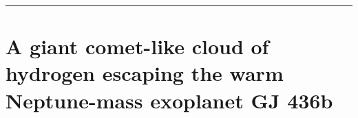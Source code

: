 \documentclass[onecolumn]{aastex63}
\begin{document}







\vspace{1cm}
\hrule
\vspace{1cm}

\section{A giant comet-like cloud of hydrogen escaping the warm Neptune-mass exoplanet GJ 436b}
\begin{centering}

\cite{ehrenreich2015}

\end{centering}
\end{document}
